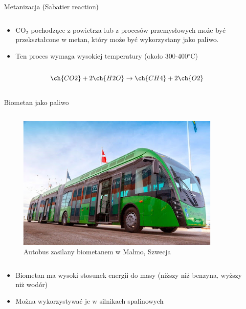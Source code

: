 \begin{columnframe}{Metanizacja (Sabatier reaction)}
    \begin{column}{0.5\textwidth}
        \begin{itemize}
            \item CO$_2$ pochodzące z powietrza lub z procesów przemysłowych może być przekształcone w metan, który może być wykorzystany jako paliwo.
            \item Ten proces wymaga wysokiej temperatury (około 300-400$^\circ$C)
        \end{itemize}
    \end{column}
    \begin{column}{0.5\textwidth}
        \[
            \ch{CO2} + 2\ch{H2O} \rightarrow \ch{CH4} + 2\ch{O2}
        \]
    \end{column}
\end{columnframe}

\begin{columnframe}{Biometan jako paliwo}
    \begin{column}{0.5\textwidth}
        \begin{figure}
            \centering
            \includegraphics[width=0.9\textwidth, frame]{images/Biomethane_bus_malmo.jpg}
            \caption{Autobus zasilany biometanem w Malmo, Szwecja}
        \end{figure}
    \end{column}
    \begin{column}{0.5\textwidth}
        \begin{itemize}
            \item Biometan ma wysoki stosunek energii do masy (niższy niż benzyna, wyższy niż wodór)
            \item Można wykorzystywać je w silnikach spalinowych
        \end{itemize}
    \end{column}
\end{columnframe}

